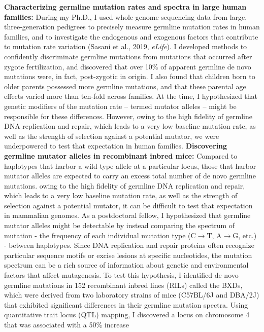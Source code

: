 \documentclass[11pt,a4paper,sans]{moderncv}
\begin{document}
\textbf{Characterizing germline mutation rates and spectra in large 
human families:}  During my Ph.D., I used whole-genome sequencing data from large, three-generation 
pedigrees to precisely measure germline mutation rates in human families, and to 
investigate the endogenous and exogenous factors that contribute to mutation rate 
variation (Sasani et al., 2019, \emph{eLife}). I developed methods to confidently 
discriminate germline mutations from mutations that occurred after zygote 
fertilization, and discovered that over 10\% of apparent germline de novo mutations 
were, in fact, post-zygotic in origin. I also found that children born to older 
parents possessed more germline mutations, and that these parental age effects 
varied more than ten-fold across families. At the time, I hypothesized that 
genetic modifiers of the mutation rate -- termed mutator alleles -- might be 
responsible for these differences. However, owing to the high fidelity of 
germline DNA replication and repair, which leads to a very low baseline mutation 
rate, as well as the strength of selection against a potential mutator, we were 
underpowered to test that expectation in human families.
\break \break
\textbf{Discovering germline mutator alleles in recombinant inbred mice:}  Compared to haplotypes that harbor a wild-type allele at a particular locus, 
those that harbor mutator alleles are expected to carry an excess total number 
of de novo germline mutations. owing to the high fidelity of germline DNA 
replication and repair, which leads to a very low baseline mutation rate, as 
well as the strength of selection against a potential mutator, it can be 
difficult to test that expectation in mammalian genomes. As a postdoctoral 
fellow, I hypothesized that germline mutator alleles might be detectable by 
instead comparing the spectrum of mutation - the frequency of each individual 
mutation type (C$\rightarrow$T, A$\rightarrow$G, etc.) - between haplotypes. Since DNA replication and 
repair proteins often recognize particular sequence motifs or excise lesions at 
specific nucleotides, the mutation spectrum can be a rich source of information 
about genetic and environmental factors that affect mutagenesis. To test this 
hypothesis, I identified de novo germline mutations in 152 recombinant inbred 
lines (RILs) called the BXDs, which were derived from two laboratory strains 
of mice (C57BL/6J and DBA/2J) that exhibited significant differences in their 
germline mutation spectra. Using quantitative trait locus (QTL) mapping, I 
discovered a locus on chromosome 4 that was associated with a 50\% increase 
\end{document}
